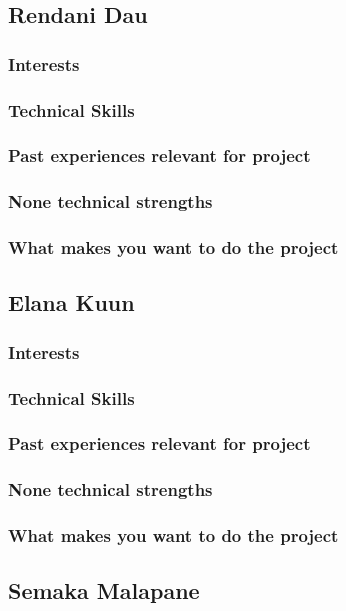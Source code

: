 \documentclass[hidelinks, 12pt, oneside]{article}
\begin{document}
\subsection{Rendani Dau}
\subsubsection{Interests}
\subsubsection{Technical Skills}
\subsubsection{Past experiences relevant for project}
\subsubsection{None technical strengths}
\subsubsection{What makes you want to do the project}

\subsection{Elana Kuun}
\subsubsection{Interests}
\subsubsection{Technical Skills}
\subsubsection{Past experiences relevant for project}
\subsubsection{None technical strengths}
\subsubsection{What makes you want to do the project}

\subsection{Semaka Malapane}
\end{document}
